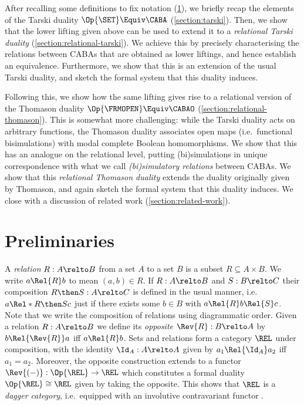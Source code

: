 After recalling some definitions to fix notation
(\cref{section:preliminaries}), we briefly recap the elements of the Tarski
duality $\Op{\SET} \Equiv \CABA$ (\cref{section:tarski}). Then, we show that the
lower lifting given above can be used to extend it to a \emph{relational Tarski
duality} (\cref{section:relational-tarski}). We achieve this by precisely
characterising the relations between CABAs that are obtained as lower liftings,
and hence establish an equivalence. Furthermore, we show that this is an
extension of the usual Tarski duality, and sketch the formal system that this
duality induces.

Following this, we show how the same lifting gives rise to a relational version
of the Thomason duality $\Op{\FRMOPEN} \Equiv \CABAO$
(\cref{section:relational-thomason}). This is somewhat more challenging: while
the Tarski duality acts on arbitrary functions, the Thomason duality associates
open maps (i.e.\ functional bisimulations) with modal complete Boolean
homomorphisms. We show that this has an analogue on the relational level,
putting (bi)simulations in unique correspondence with what we call
\emph{(bi)simulatory relations} between CABAs. We show that this
\emph{relational Thomason duality} extends the duality originally given by
Thomason, and again sketch the formal system that this duality induces.
We close with a discussion of related work (\cref{section:related-work}).


\section{Preliminaries}\label{section:preliminaries}

A \emph{relation} $R : A \relto B$ from a set $A$ to a set $B$ is a subset $R
\subseteq A \times B$. We write $a \Rel{R} b$ to mean $(a, b) \in R$. If $R : A
\relto B$ and $S : B \relto C$ their composition $R \then S : A \relto C$ is
defined in the usual manner, i.e.\ $a \Rel*{R \then S} c$ just if there exists
some $b \in B$ with $a \Rel{R} b \Rel{S} c$. Note that we write the composition
of relations using diagrammatic order. Given a relation $R : A \relto B$ we
define its \emph{opposite} $\Rev{R} : B \relto A$ by $b \Rel{\Rev{R}} a$ iff $a
\Rel{R} b$. Sets and relations form a category $\REL$ under composition, with
the identity $\Id_A : A \relto A$ given by $a_1 \Rel{\Id_A} a_2$ iff $a_1 =
a_2$. Moreover, the opposite construction extends to a functor \(\Rev{(-)} :
\Op{\REL} \to \REL\) which constitutes a formal duality $\Op{\REL} \cong \REL$
given by taking the opposite. This shows that $\REL$ is a \emph{dagger
category}, i.e.\ equipped with an involutive contravariant functor \cite[\S
2.3.1]{heunen_2019}.

